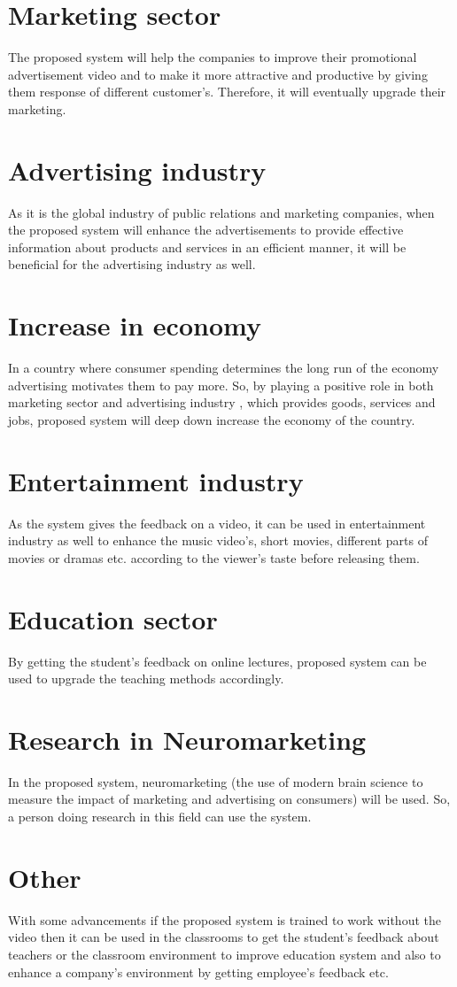 \documentclass[a4paper, 12pt, oneside]{uet_thesis}
\begin{document}
\section{Marketing sector}
The proposed system will help the companies to improve their promotional advertisement video and to make it more attractive and productive by giving them response of different customer’s. Therefore, it will eventually upgrade their marketing. 
\section{Advertising industry}
As it is the global industry of public relations and marketing companies, when the proposed system will enhance the advertisements to provide effective information about products and services in an efficient manner, it will be beneficial for the advertising industry as well.
\section{Increase in economy}
In a country where consumer spending determines the long run of the economy advertising motivates them to pay more. So, by playing a positive role in both marketing sector and advertising industry , which provides goods, services and jobs, proposed system will deep down increase the economy of the country.
\section{Entertainment industry}
As the system gives the feedback on a video, it can be used in entertainment industry as well to enhance the music video’s, short movies, different parts of movies or dramas etc. according to the viewer’s taste before releasing them.  
\section{Education sector}
By getting the student’s feedback on online lectures, proposed system can be used to upgrade the teaching methods accordingly. 
\section{Research in Neuromarketing}
In the proposed system, neuromarketing (the use of modern brain science to measure the impact of marketing and advertising on consumers) will be used. So, a person doing research in this field can use the system.
\section{Other}
With some advancements if the proposed system is trained to work without the video then it can be used in the classrooms to get the student’s feedback about teachers or the classroom environment to improve education system and also to enhance a company’s environment by getting employee’s feedback etc. 
\end{document}
